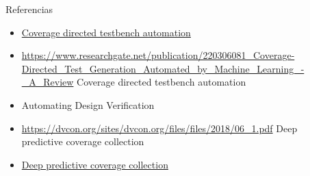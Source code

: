 \documentclass[final]{beamer}
\newlength{\sepwid}
\newlength{\onecolwid}
\begin{document}
\begin{frame}[t]
\begin{columns}[t]
\begin{column}{\onecolwid}
\begin{block}{Referencias}

\begin{itemize}
\item \href{https://www.researchgate.net/publication/220306081_Coverage-Directed_Test_Generation_Automated_by_Machine_Learning_-_A_Review}{Coverage directed testbench automation} 
\item \url{https://www.researchgate.net/publication/220306081_Coverage-Directed_Test_Generation_Automated_by_Machine_Learning_-_A_Review}{ Coverage directed testbench automation}
\item Automating Design Verification
\item \url{https://dvcon.org/sites/dvcon.org/files/files/2018/06_1.pdf}{ Deep predictive coverage collection}
\item \href{https://dvcon.org/sites/dvcon.org/files/files/2018/06_1.pdf}{Deep predictive coverage collection}
\end{itemize}
\end{block}













\end{column} %

\begin{column}{\sepwid}\end{column} %



\end{columns} %

\end{frame} %
\end{document}
